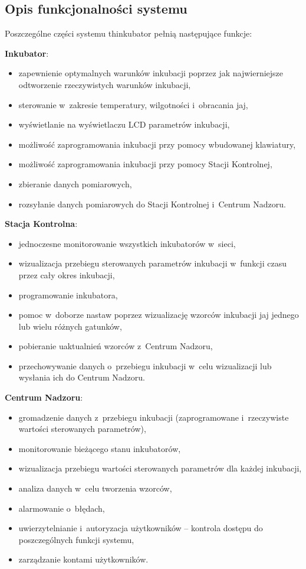 \subsection{Opis funkcjonalności systemu}
Poszczególne części systemu thinkubator pełnią następujące funkcje:

\noindent\textbf{Inkubator}:
\begin{itemize}
	\item zapewnienie optymalnych warunków inkubacji poprzez jak najwierniejsze
		odtworzenie rzeczywistych warunków inkubacji,
	\item sterowanie w~zakresie temperatury, wilgotności i~obracania jaj,
	\item wyświetlanie na wyświetlaczu LCD parametrów inkubacji,
	\item możliwość zaprogramowania inkubacji przy pomocy wbudowanej klawiatury,
	\item możliwość zaprogramowania inkubacji przy pomocy Stacji Kontrolnej,
	\item zbieranie danych pomiarowych,
	\item rozsyłanie danych pomiarowych do Stacji Kontrolnej i~Centrum Nadzoru.
\end{itemize}
\textbf{Stacja Kontrolna}:
\begin{itemize}
	\item jednoczesne monitorowanie wszystkich inkubatorów w~sieci,
	\item wizualizacja przebiegu sterowanych parametrów inkubacji w~funkcji czasu
		przez cały okres inkubacji,
	\item programowanie inkubatora,
	\item pomoc w~doborze nastaw poprzez wizualizację wzorców inkubacji jaj
		jednego lub wielu różnych gatunków,
	\item pobieranie uaktualnień wzorców z~Centrum Nadzoru,
	\item przechowywanie danych o~przebiegu inkubacji w~celu wizualizacji lub
		wysłania ich do Centrum Nadzoru.
\end{itemize}
\textbf{Centrum Nadzoru}:
\begin{itemize}
	\item gromadzenie danych z~przebiegu inkubacji (zaprogramowane i~rzeczywiste
		wartości sterowanych parametrów),
	\item monitorowanie bieżącego stanu inkubatorów,
	\item wizualizacja przebiegu wartości sterowanych parametrów dla każdej
		inkubacji,
	\item analiza danych w~celu tworzenia wzorców,
	\item alarmowanie o~błędach,
	\item uwierzytelnianie i~autoryzacja użytkowników -- kontrola dostępu do
		poszczególnych funkcji systemu,
	\item zarządzanie kontami użytkowników.
\end{itemize}

